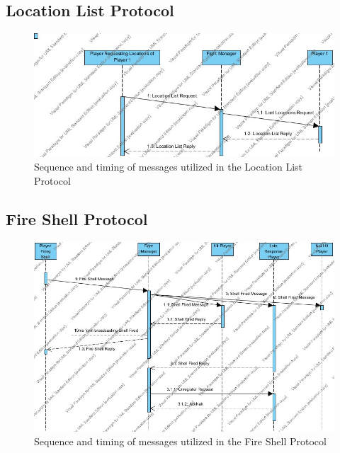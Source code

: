 \documentclass[12pt]{article}
\begin{document}
	\subsection{Location List Protocol}
		\begin{center}
			\begin{figure}[htp]
				\centering
				\includegraphics[width=.7\textwidth]{Diagrams/Sequence Diagrams/Location List Protocol Sequence.jpg}
				\caption{Sequence and timing of messages utilized in the Location List Protocol}
			\end{figure}
		\end{center}
	\newpage
	\subsection{Fire Shell Protocol}
		\begin{center}
			\begin{figure}[htp]
				\centering
				\includegraphics[width=\textwidth]{Diagrams/Sequence Diagrams/Fire Shell Protocol Sequence.jpg}
				\caption{Sequence and timing of messages utilized in the Fire Shell Protocol}
			\end{figure}
		\end{center}
	\newpage
\end{document}
